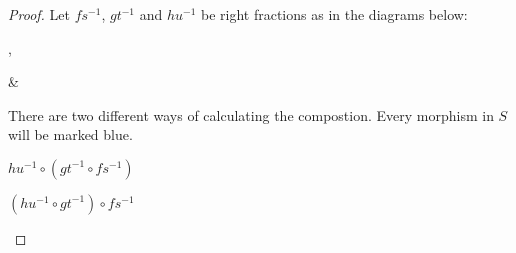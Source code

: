 \documentclass[12pt]{article}
\theoremstyle{definition}
\theoremstyle{remark}
\begin{document}
            \begin{proof}
                Let $fs^{-1}$, $gt^{-1}$ and $hu^{-1}$ be right fractions as in the diagrams below:
                \begin{center}
                    ,
                    \&
                \end{center}
                There are two different ways of calculating the compostion. Every morphism in $S$ will be marked blue.
                \begin{center}
                    \begin{minipage}[c]{0.4\textwidth}
                        \underline{$hu^{-1}\circ (gt^{-1}\circ fs^{-1})$}\\
                    \end{minipage}
                    \begin{minipage}[c]{0.4\textwidth}
                        \underline{$(hu^{-1}\circ gt^{-1})\circ fs^{-1}$}\\
\end{minipage}
\end{center}
\end{proof}
\end{document}
